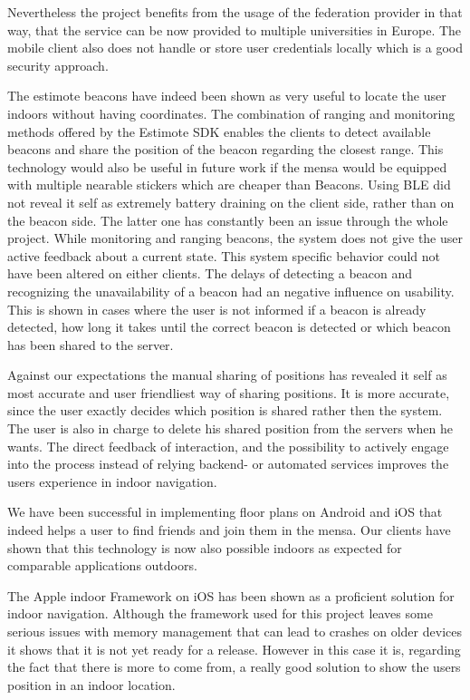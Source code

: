 Nevertheless the project benefits from the usage of the federation provider in that way, that the service can be now provided to multiple universities in Europe. The mobile client also does not handle or store user credentials locally which is a good security approach. 




The estimote beacons have indeed been shown as very useful to locate the user indoors without having coordinates. The combination of ranging and monitoring methods offered by the Estimote SDK enables the clients to detect available beacons and share the position of the beacon regarding the closest range. This technology would also be useful in future work if the mensa would be equipped with multiple nearable stickers which are cheaper than Beacons. Using BLE did not reveal it self as extremely battery draining on the client side, rather than on the beacon side. The latter one has constantly been an issue through the whole project. 
While monitoring and ranging beacons, the system does not give the user active feedback about a current state. This system specific behavior could not have been altered on either clients. The delays of detecting a beacon and recognizing the unavailability of a beacon had an negative influence on usability. This is shown in cases where the user is not informed if a beacon is already
detected, how long it takes until the correct beacon is detected or which beacon has been shared to the server. 



Against our expectations the manual sharing of positions has revealed it self as most accurate and user friendliest way of sharing positions. It is more accurate, since the user exactly decides which position is shared rather then the system. The user is also in charge to delete his shared position from the servers when he wants. The direct feedback of interaction, and the possibility to actively engage into the process instead of relying backend- or automated services improves the users experience in indoor navigation. 

We have been successful in implementing floor plans on Android and iOS that indeed helps a user to find friends and join them in the mensa. Our clients have shown that this technology is now also possible indoors as expected for comparable applications outdoors. 

The Apple indoor Framework on iOS has been shown as a proficient solution for indoor navigation. Although the framework used for this project leaves some serious issues with memory management that can lead to crashes on older devices it shows that it is not yet ready for a release. However in this case it is, regarding the fact that there is more to come from, a really good solution to show the users position in an indoor location.









